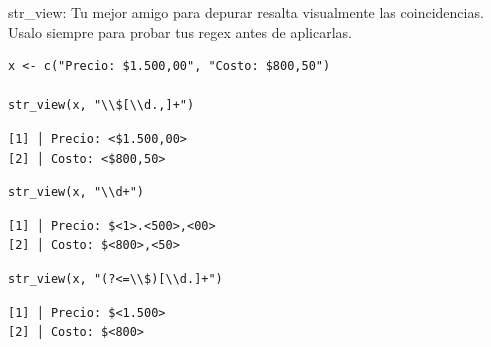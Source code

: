 \documentclass[8pt]{beamer}
\begin{document}
\begin{frame}[fragile]{str\_view: Tu mejor amigo para depurar}
	 resalta visualmente las coincidencias. Usalo siempre para probar tus regex antes de aplicarlas.
\begin{lstlisting}[style=RScript]
x <- c("Precio: $1.500,00", "Costo: $800,50")

str_view(x, "\\$[\\d.,]+")
\end{lstlisting}
\begin{lstlisting}[style=RConsole]
[1] │ Precio: <$1.500,00>
[2] │ Costo: <$800,50>
\end{lstlisting}
\begin{lstlisting}[style=RScript]
str_view(x, "\\d+")
\end{lstlisting}
\begin{lstlisting}[style=RConsole]
[1] │ Precio: $<1>.<500>,<00>
[2] │ Costo: $<800>,<50>
\end{lstlisting}
\begin{lstlisting}[style=RScript]
str_view(x, "(?<=\\$)[\\d.]+")
\end{lstlisting}
\begin{lstlisting}[style=RConsole]
[1] │ Precio: $<1.500>
[2] │ Costo: $<800>
\end{lstlisting}
\end{frame}
\end{document}
